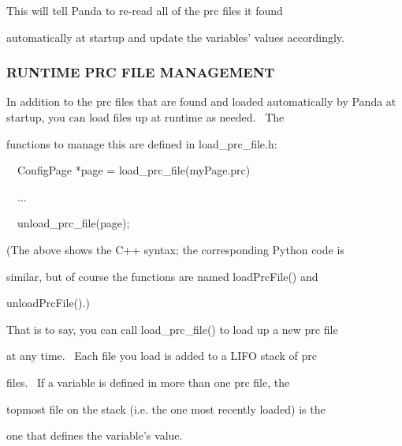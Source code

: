\documentclass[a4paper]{article}
\begin{document}
{\color{black}
This will tell Panda to re-read all of the prc files it found}

{\color{black}
automatically at startup and update the variables' values accordingly.}


\bigskip

\subsubsection{}
\clearpage
\bigskip

\subsubsection[RUNTIME PRC FILE MANAGEMENT]{RUNTIME PRC FILE MANAGEMENT}
\hypertarget{RefHeading312401927442421}{}
\bigskip

{\color{black}
In addition to the prc files that are found and loaded automatically by Panda at startup, you can load files up at
runtime as needed. \ The}

{\color{black}
functions to manage this are defined in load\_prc\_file.h:}


\bigskip

{\color{black}
\ \ ConfigPage *page = load\_prc\_file({\textquotedbl}myPage.prc{\textquotedbl})}


\bigskip

{\color{black}
\ \ ...}


\bigskip

{\color{black}
\ \ unload\_prc\_file(page);}


\bigskip

{\color{black}
(The above shows the C++ syntax; the corresponding Python code is}

{\color{black}
similar, but of course the functions are named loadPrcFile() and}

{\color{black}
unloadPrcFile().)}


\bigskip

{\color{black}
That is to say, you can call load\_prc\_file() to load up a new prc file}

{\color{black}
at any time. \ Each file you load is added to a LIFO stack of prc}

{\color{black}
files. \ If a variable is defined in more than one prc file, the}

{\color{black}
topmost file on the stack (i.e. the one most recently loaded) is the}

{\color{black}
one that defines the variable's value.}
\end{document}
